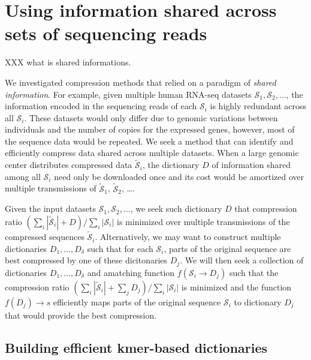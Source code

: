 \documentclass[12pt]{cmuthesis}
\begin{document}
\section{Using information shared across sets of sequencing reads}

  \newcommand{\seq}{\mathcal{S}\xspace}
  \newcommand{\compseq}{\widetilde{\mathcal{S}}\xspace}

  XXX what is shared informations.
  

  We investigated compression methods that relied on a paradigm of \textit{shared information}. For example, given multiple human RNA-seq datasets $\mathcal{ S}_1, \mathcal{ S}_2, \ldots$, the information encoded in the sequencing reads of each $\mathcal{ S}_i$ is highly redundant across all $\mathcal{S}_i$.  These datasets would only differ due to genomic variations between individuals and the number of copies for the expressed genes, however, most of the sequence data would be repeated. We seek a method that can identify and efficiently compress data shared across multiple datasets. When a large genomic center distributes compressed data $\mathcal{\widetilde S}_i$, the dictionary $D$ of information shared among all $\mathcal{S}_i$ need only be downloaded once and its cost would be amortized over multiple transmissions of $\mathcal{\widetilde S}_1$, $\mathcal{\widetilde S}_2$, \ldots.

  Given the input datasets $\mathcal{ S}_1, \mathcal{ S}_2, \ldots$, we seek such dictionary $D$ that compression ratio $(\sum_i |\compseq_i| + D) / \sum_i |\seq_i|$ is minimized over multiple transmissions of the compressed sequences $\compseq_i$. Alternatively, we may want to construct multiple dictionaries $D_1, \ldots, D_\delta$ such that for each $\seq_i$, parts of the original sequence are best compressed by one of these dicitonaries $D_j$. We will then seek a collection of dictionaries $D_1, \ldots, D_\delta$ and amatching function $f(\seq_i \to D_j)$ such that the compression ratio $(\sum_i |\compseq_i| + \sum_j D_j) / \sum_i |\seq_i|$ is minimized and the function $f(D_j) \to s$ efficiently maps parts of the original sequence $\seq_i$ to dictionary $D_j$ that would provide the best compression.

\subsection{Building efficient kmer-based dictionaries}
\end{document}
